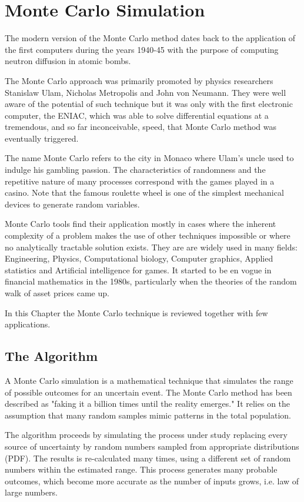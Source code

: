\chapter{Monte Carlo Simulation}
\label{cap:montecarlo}

The modern version of the Monte Carlo method dates back to the application of the first computers during the years 1940-45 with the purpose of computing neutron diffusion in atomic bombs.

The Monte Carlo approach was primarily promoted by physics researchers Stanislaw Ulam, Nicholas Metropolis and John von Neumann. They were well aware of the potential of such technique but it was only with the first electronic computer, the ENIAC, which was able to solve differential equations at a tremendous, and so far inconceivable, speed, that Monte Carlo method was eventually triggered.

The name Monte Carlo refers to the city in Monaco where Ulam's uncle used to indulge his gambling passion. The characteristics of randomness and the repetitive nature of many processes correspond with the games played in a casino. Note that the famous roulette wheel is one of the simplest mechanical devices to generate random variables.

Monte Carlo tools find their application mostly in cases where the inherent complexity of a problem makes the use of other techniques impossible or where no analytically tractable solution exists.
They are are widely used in many fields: Engineering, Physics, Computational biology, Computer graphics, Applied statistics and Artificial intelligence for games. It started to be en vogue in financial mathematics in the 1980s, particularly when the theories of the random walk of asset prices came up.

In this Chapter the Monte Carlo technique is reviewed together with few applications.

\section{The Algorithm}
\label{whats-monte-carlo-simulation}

A Monte Carlo simulation is a mathematical technique that simulates the range of possible outcomes for an uncertain event.
The Monte Carlo method has been described as "faking it a billion times until the reality emerges." It relies on the assumption that many random samples mimic patterns in the total population.

The algorithm proceeds by simulating the process under study replacing every source of uncertainty by random numbers sampled from appropriate distributions (PDF).
The results is re-calculated many times, using a different set of random numbers within the estimated range. This process generates many probable outcomes, which become more accurate as the number of inputs grows, i.e. law of large numbers.

